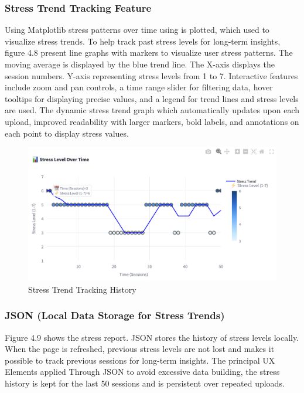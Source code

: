 \documentclass[Arial,12pt,openright,twoside]{book}
\begin{document}
    \subsubsection{ Stress Trend Tracking Feature}
     Using Matplotlib stress patterns over time using is plotted, which used to visualize stress trends. To help track past stress levels for long-term insights, figure 4.8 present line graphs with markers to visualize user stress patterns.  The moving average is displayed by the blue trend line. The X-axis displays the session numbers. Y-axis representing stress levels from 1 to 7. Interactive features include zoom and pan controls, a time range slider for filtering data, hover tooltips for displaying precise values, and a legend for trend lines and stress levels are used. The dynamic stress trend graph which automatically updates upon each upload, improved readability with larger markers, bold labels, and annotations on each point to display stress values. 
\vspace{10pt} %
     \begin{figure}[htbp!]
    \centering
    \includegraphics[width=1.0\columnwidth]{stresstrend3.png}
    \caption{Stress Trend Tracking History}
    \label{fig:system_architecture}
\end{figure}
\vspace{10pt} %
    \subsubsection{ JSON (Local Data Storage for Stress Trends)}
    Figure 4.9 shows the stress report. JSON stores the history of stress levels locally. When the page is refreshed, previous stress levels are not lost and makes it possible to track previous sessions for long-term insights. The principal UX Elements applied Through JSON to avoid excessive data building, the stress history is kept for the last 50 sessions and is persistent over repeated uploads.
\end{document}
